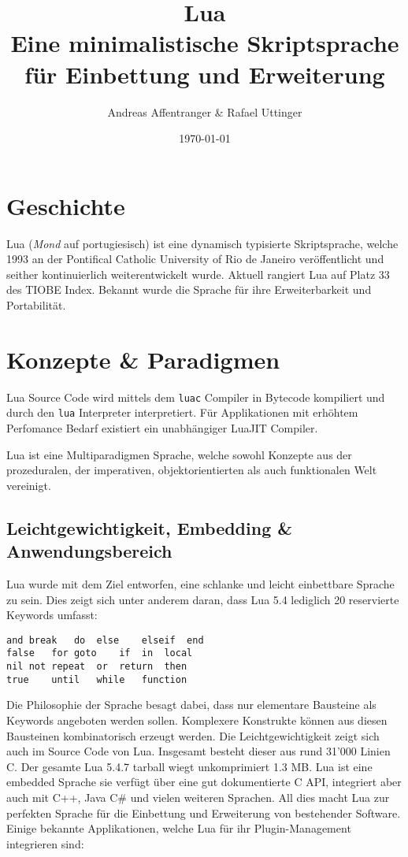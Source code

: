 \documentclass[11pt,a4paper]{article}
\title{Lua \\ [0.2em]\large Eine minimalistische Skriptsprache für Einbettung und Erweiterung}
\author{Andreas Affentranger \& Rafael Uttinger}
\date{\today}
\begin{document}
\maketitle

\section*{Geschichte}

Lua (\textit{Mond} auf portugiesisch) ist eine dynamisch typisierte Skriptsprache, welche 1993 an der Pontifical Catholic University of Rio de Janeiro veröffentlicht und seither kontinuierlich weiterentwickelt wurde. Aktuell rangiert Lua auf Platz 33 des TIOBE Index. Bekannt wurde die Sprache für ihre Erweiterbarkeit und Portabilität.

\section*{Konzepte \& Paradigmen}

Lua Source Code wird mittels dem \texttt{luac} Compiler in Bytecode kompiliert und durch den \texttt{lua} Interpreter interpretiert. Für Applikationen mit erhöhtem Perfomance Bedarf existiert ein unabhängiger LuaJIT Compiler.

Lua ist eine Multiparadigmen Sprache, welche sowohl Konzepte aus der prozeduralen, der imperativen, objektorientierten als auch funktionalen Welt vereinigt.

\subsection*{Leichtgewichtigkeit, Embedding \& Anwendungsbereich}

Lua wurde mit dem Ziel entworfen, eine schlanke und leicht einbettbare Sprache zu sein. Dies zeigt sich unter anderem daran, dass Lua 5.4 lediglich 20 reservierte Keywords umfasst:

\begin{lstlisting}
and	break	do	else	elseif	end
false	for	goto 	if	in	local
nil	not	repeat	or	return	then
true	until	while	function
\end{lstlisting}

Die Philosophie der Sprache besagt dabei, dass nur elementare Bausteine als Keywords angeboten werden sollen. Komplexere Konstrukte können aus diesen Bausteinen kombinatorisch erzeugt werden. Die Leichtgewichtigkeit zeigt sich auch im Source Code von Lua. Insgesamt besteht dieser aus rund 31’000 Linien C. Der gesamte Lua 5.4.7 tarball wiegt unkomprimiert 1.3 MB.
Lua ist eine embedded Sprache sie verfügt über eine gut dokumentierte C API, integriert aber auch mit C++, Java C\# und vielen weiteren Sprachen. All dies macht Lua zur perfekten Sprache für die Einbettung und Erweiterung von bestehender Software.
Einige bekannte Applikationen, welche Lua für ihr Plugin-Management integrieren sind:
\end{document}
